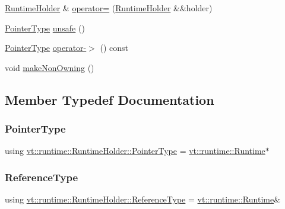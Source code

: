 \begin{DoxyCompactItemize}
\hyperlink{structvt_1_1runtime_1_1_runtime_holder}{Runtime\+Holder} \& \hyperlink{structvt_1_1runtime_1_1_runtime_holder_a77b0ac53097a24b419cdd33193627b11}{operator=} (\hyperlink{structvt_1_1runtime_1_1_runtime_holder}{Runtime\+Holder} \&\&holder)
\item 
\hyperlink{structvt_1_1runtime_1_1_runtime_holder_a9740e8aa7487fcf38b67a7e160d7b046}{Pointer\+Type} \hyperlink{structvt_1_1runtime_1_1_runtime_holder_aacba0762fe099fb04faa1fb308c7782b}{unsafe} ()
\item 
\hyperlink{structvt_1_1runtime_1_1_runtime_holder_a9740e8aa7487fcf38b67a7e160d7b046}{Pointer\+Type} \hyperlink{structvt_1_1runtime_1_1_runtime_holder_a63745eba0493db2bc670e633733ae908}{operator-\/$>$} () const
\item 
void \hyperlink{structvt_1_1runtime_1_1_runtime_holder_a3695fd20ff4f9058f34cb45e2b61232f}{make\+Non\+Owning} ()
\end{DoxyCompactItemize}


\subsection{Member Typedef Documentation}
\mbox{\label{structvt_1_1runtime_1_1_runtime_holder_a9740e8aa7487fcf38b67a7e160d7b046}} 
\subsubsection{\texorpdfstring{Pointer\+Type}{PointerType}}
{\footnotesize\ttfamily using \hyperlink{structvt_1_1runtime_1_1_runtime_holder_a9740e8aa7487fcf38b67a7e160d7b046}{vt\+::runtime\+::\+Runtime\+Holder\+::\+Pointer\+Type} =  \hyperlink{structvt_1_1runtime_1_1_runtime}{vt\+::runtime\+::\+Runtime}$\ast$}

\mbox{\label{structvt_1_1runtime_1_1_runtime_holder_a45aaa245b06497cfce58452b0d64b3fa}} 
\subsubsection{\texorpdfstring{Reference\+Type}{ReferenceType}}
{\footnotesize\ttfamily using \hyperlink{structvt_1_1runtime_1_1_runtime_holder_a45aaa245b06497cfce58452b0d64b3fa}{vt\+::runtime\+::\+Runtime\+Holder\+::\+Reference\+Type} =  \hyperlink{structvt_1_1runtime_1_1_runtime}{vt\+::runtime\+::\+Runtime}\&}




